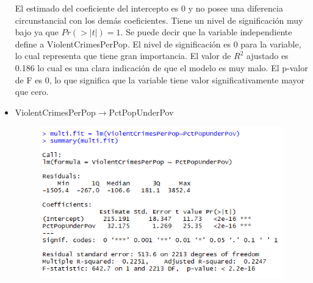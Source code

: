\documentclass[a4paper,10pt,twocolumn]{article}
\begin{document}
\begin{itemize}
	El estimado del coeficiente del intercepto es 0 y no posee una diferencia circunstancial con los demás coeficientes. Tiene un nivel de significación muy bajo ya que $Pr(> | t | ) =1$.
	Se puede decir que la variable independiente define a ViolentCrimesPerPop. El nivel de significación es 0 para la variable, lo cual representa que tiene gran importancia. El valor de $R^2$ ajustado es 0.186 lo cual es una clara indicación de que el modelo es muy malo. El p-valor de F es 0, lo que significa que la variable tiene valor significativamente mayor que cero.

	\item {ViolentCrimesPerPop$\rightarrow$PctPopUnderPov}






		\begin{figure}[H]
			\begin{center}
				\includegraphics[width=.92\columnwidth,right]{figures/multifit4.png}
			\end{center}
		\end{figure}


\end{itemize}
\end{document}
